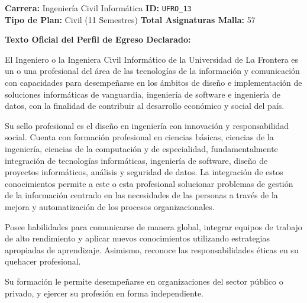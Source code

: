 \documentclass[11pt,a4paper]{article}
\begin{document}
\begin{tcolorbox}[fichaStyle, title={UNIVERSIDAD 13: Universidad de la Frontera (UFRO)}]
\small\sffamily
\textbf{Carrera:} Ingeniería Civil Informática \hfill \textbf{ID:} \texttt{UFRO\_13} \\
\textbf{Tipo de Plan:} Civil (11 Semestres) \hfill \textbf{Total Asignaturas Malla:} 57

\tcbline

\textbf{Texto Oficial del Perfil de Egreso Declarado:}\\[4pt]
{\small\rmfamily
El Ingeniero o la Ingeniera Civil Informático de la Universidad de La Frontera es un o una profesional del área de las tecnologías de la información y comunicación con capacidades para desempeñarse en los ámbitos de diseño e implementación de soluciones informáticas de vanguardia, ingeniería de software e ingeniería de datos, con la finalidad de contribuir al desarrollo económico y social del país.

\vspace{4pt}
Su sello profesional es el diseño en ingeniería con innovación y responsabilidad social. Cuenta con formación profesional en ciencias básicas, ciencias de la ingeniería, ciencias de la computación y de especialidad, fundamentalmente integración de tecnologías informáticas, ingeniería de software, diseño de proyectos informáticos, análisis y seguridad de datos. La integración de estos conocimientos permite a este o esta profesional solucionar problemas de gestión de la información centrado en las necesidades de las personas a través de la mejora y automatización de los procesos organizacionales.

\vspace{4pt}
Posee habilidades para comunicarse de manera global, integrar equipos de trabajo de alto rendimiento y aplicar nuevos conocimientos utilizando estrategias apropiadas de aprendizaje. Asimismo, reconoce las responsabilidades éticas en su quehacer profesional.

\vspace{4pt}
Su formación le permite desempeñarse en organizaciones del sector público o privado, y ejercer su profesión en forma independiente.
}
\end{tcolorbox}

\newpage
\end{document}
